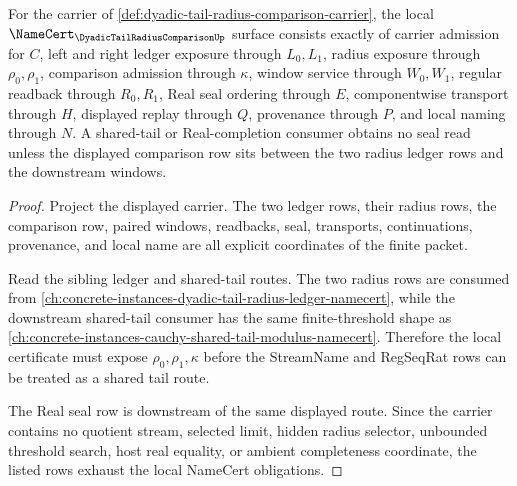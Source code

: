 \begin{theorem}
\label{thm:dyadic-tail-radius-comparison-namecert-obligations}
For the carrier of \autoref{def:dyadic-tail-radius-comparison-carrier}, the local $\NameCert_{\DyadicTailRadiusComparisonUp}$ surface consists exactly of carrier admission for $C$, left and right ledger exposure through $L_0,L_1$, radius exposure through $\rho_0,\rho_1$, comparison admission through $\kappa$, window service through $W_0,W_1$, regular readback through $R_0,R_1$, Real seal ordering through $E$, componentwise transport through $H$, displayed replay through $Q$, provenance through $P$, and local naming through $N$. A shared-tail or Real-completion consumer obtains no seal read unless the displayed comparison row sits between the two radius ledger rows and the downstream windows.
\end{theorem}
\begin{proof}
Project the displayed carrier. The two ledger rows, their radius rows, the comparison row, paired windows, readbacks, seal, transports, continuations, provenance, and local name are all explicit coordinates of the finite packet.

Read the sibling ledger and shared-tail routes. The two radius rows are consumed from \autoref{ch:concrete-instances-dyadic-tail-radius-ledger-namecert}, while the downstream shared-tail consumer has the same finite-threshold shape as \autoref{ch:concrete-instances-cauchy-shared-tail-modulus-namecert}. Therefore the local certificate must expose $\rho_0,\rho_1,\kappa$ before the StreamName and RegSeqRat rows can be treated as a shared tail route.

The Real seal row is downstream of the same displayed route. Since the carrier contains no quotient stream, selected limit, hidden radius selector, unbounded threshold search, host real equality, or ambient completeness coordinate, the listed rows exhaust the local NameCert obligations.
\end{proof}

